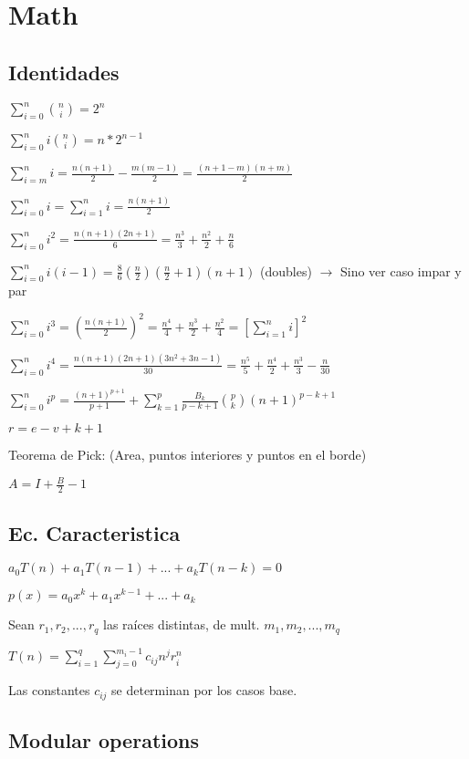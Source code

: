 \newpage
\section{Math}

\subsection{Identidades}
{
$\sum_{i=0}^n\binom{n}{i}=2^n$

$\sum_{i=0}^n i\binom{n}{i}=n*2^{n-1}$

$\sum_{i=m}^n i = \frac{n(n+1)}{2} - \frac{m(m-1)}{2} = \frac{(n+1-m)(n+m)}{2}$

$\sum_{i=0}^n i = \sum_{i=1}^n i = \frac{n(n+1)}{2}$

$\sum_{i=0}^n i^2 = \frac{n(n+1)(2n+1)}{6} = \frac{n^3}{3} + \frac{n^2}{2} + \frac{n}{6}$

$\sum_{i=0}^n i(i-1) = \frac{8}{6}(\frac{n}{2})(\frac{n}{2}+1)(n+1)$ (doubles) $\rightarrow$ Sino ver caso impar y par

$\sum_{i=0}^n i^3 = \left(\frac{n(n+1)}{2}\right)^2 = \frac{n^4}{4} + \frac{n^3}{2} + \frac{n^2}{4} = \left[\sum_{i=1}^n i\right]^2$

$\sum_{i=0}^n i^4 = \frac{n(n+1)(2n+1)(3n^2+3n-1)}{30} = \frac{n^5}{5} + \frac{n^4}{2} + \frac{n^3}{3} - \frac{n}{30}$

$\sum_{i=0}^n i^p = \frac{(n+1)^{p+1}}{p+1} + \sum_{k=1}^p\frac{B_k}{p-k+1}{p\choose k}(n+1)^{p-k+1}$

$r=e-v+k+1$

Teorema de Pick: (Area, puntos interiores y puntos en el borde)

$A=I+\frac{B}{2}-1$


}%
\subsection{Ec. Caracteristica}
$a_0T(n)+a_1T(n-1)+...+a_kT(n-k)=0$

$p(x)=a_0 x^k + a_1 x^{k-1} + ... + a_k$

Sean $r_1,r_2,...,r_q$ las ra\'ices distintas, de mult. $m_1, m_2, ..., m_q$

$T(n)=\sum_{i=1}^q{\sum_{j=0}^{m_i - 1}c_{ij} n^j r_i^n}$

Las constantes $c_{ij}$ se determinan por los casos base.

\newpage
\subsection{Modular operations}

